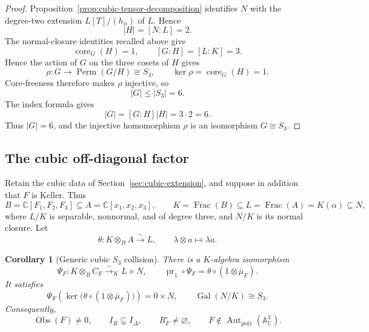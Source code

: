 \documentclass[11pt]{article}
\newtheorem{corollary}[theorem]{Corollary}
\theoremstyle{remark}
\theoremstyle{definition}
\DeclareMathOperator{\Frac}{Frac}
\DeclareMathOperator{\Gal}{Gal}
\DeclareMathOperator{\Aut}{Aut}
\DeclareMathOperator{\core}{core}
\newcommand{\A}{\mathbb A}
\newcommand{\C}{\mathbb C}
\newcommand{\Obs}{\operatorname{Obs}}
\begin{document}
\begin{proof}
Proposition~\ref{prop:cubic-tensor-decomposition} identifies \(N\) with
the degree-two extension \(L[T]/(h_\alpha)\) of \(L\).  Hence
\[
  |H|=[N:L]=2.
\]
The normal-closure identities recalled above give
\[
  \core_G(H)=1,
  \qquad
  [G:H]=[L:K]=3.
\]
Hence the action of \(G\) on the three cosets of \(H\) gives
\[
  \rho\colon G\longrightarrow\operatorname{Perm}(G/H)\cong S_3,
  \qquad
  \ker\rho=\core_G(H)=1.
\]
Core-freeness therefore makes \(\rho\) injective, so
\[
  |G|\leq |S_3|=6.
\]
The index formula gives
\[
  |G|=[G:H]|H|=3\cdot2=6.
\]
Thus \(|G|=6\), and the injective homomorphism \(\rho\) is an
isomorphism \(G\cong S_3\).
\end{proof}

\subsection{The cubic off-diagonal factor}

Retain the cubic data of Section~\ref{sec:cubic-extension}, and suppose
in addition that \(F\) is Keller.  Thus
\[
  B=\C[F_1,F_2,F_3]\subseteq A=\C[x_1,x_2,x_3],
  \qquad
  K=\Frac(B)\subseteq L=\Frac(A)=K(\alpha)\subseteq N,
\]
where \(L/K\) is separable, nonnormal, and of degree three, and \(N/K\)
is its normal closure.  Let
\[
  \theta\colon K\otimes_BA\xrightarrow{\sim}L,
  \qquad
  \lambda\otimes a\longmapsto\lambda a.
\]

\begin{corollary}[Generic cubic \(S_3\) collision]
\label{cor:cubic-s3-collision}
There is a \(K\)-algebra isomorphism
\[
  \Psi_F\colon
  K\otimes_BC_F\xrightarrow{\sim}_K L\times N,
  \qquad
  \operatorname{pr}_1\circ\Psi_F
  =
  \theta\circ(1\otimes\bar\mu_F).
\]
It satisfies
\[
  \Psi_F\!\left(
    \ker\bigl(\theta\circ(1\otimes\bar\mu_F)\bigr)
  \right)
  =
  0\times N,
  \qquad
  \Gal(N/K)\cong S_3.
\]
Consequently,
\[
  \Obs(F)\neq0,
  \qquad
  I_R\subsetneq I_\Delta,
  \qquad
  R_F^\circ\neq\varnothing,
  \qquad
  F\notin\Aut_{\mathrm{poly}}(\A^3_{\C}).
\]
\end{corollary}
\end{document}
